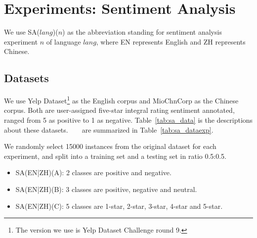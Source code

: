 \section{Experiments: Sentiment Analysis}
We use SA($lang$)($n$) as the abbreviation standing for sentiment analysis experiment $n$ of language $lang$, where EN represents English and ZH represents Chinese.
\subsection{Datasets}
We use Yelp Dataset\footnote{The version we use is Yelp Dataset Challenge round 9.}\cite{Yelp} as the English corpus and MioChnCorp\cite{MioChnCorp} as the Chinese corpus.
Both are user-assigned five-star integral rating sentiment annotated, ranged from 5 as positive to 1 as negative. 
Table~\ref{tab:sa_data} is the descriptions about these datasets.
~\newline
~\newline
{} are summarized in Table~\ref{tab:sa_dataexp}.
\par We randomly select 15000 instances from the original dataset for each experiment, and split into a training set and a testing set in ratio 0.5:0.5.
\begin{itemize}
\item SA(EN|ZH)(A): 2 classes are positive and negative.
\item SA(EN|ZH)(B): 3 classes are positive, negative and neutral.
\item SA(EN|ZH)(C): 5 classes are 1-star, 2-star, 3-star, 4-star and 5-star.
\end{itemize}

\vspace{-\intextsep}


